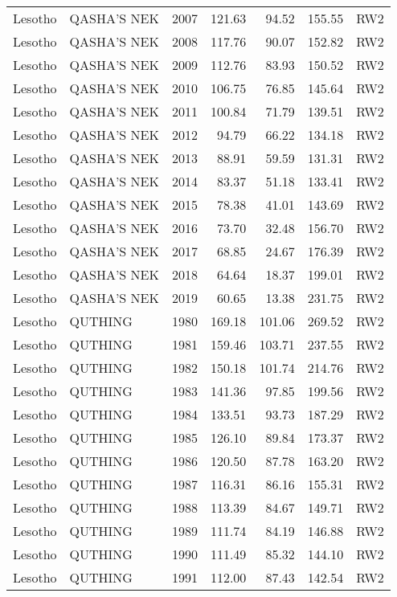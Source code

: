 \begin{longtable}{lllrrrl}
  Lesotho & QASHA'S NEK & 2007 & 121.63 & 94.52 & 155.55 & RW2 \\ 
  Lesotho & QASHA'S NEK & 2008 & 117.76 & 90.07 & 152.82 & RW2 \\ 
  Lesotho & QASHA'S NEK & 2009 & 112.76 & 83.93 & 150.52 & RW2 \\ 
  Lesotho & QASHA'S NEK & 2010 & 106.75 & 76.85 & 145.64 & RW2 \\ 
  Lesotho & QASHA'S NEK & 2011 & 100.84 & 71.79 & 139.51 & RW2 \\ 
  Lesotho & QASHA'S NEK & 2012 & 94.79 & 66.22 & 134.18 & RW2 \\ 
  Lesotho & QASHA'S NEK & 2013 & 88.91 & 59.59 & 131.31 & RW2 \\ 
  Lesotho & QASHA'S NEK & 2014 & 83.37 & 51.18 & 133.41 & RW2 \\ 
  Lesotho & QASHA'S NEK & 2015 & 78.38 & 41.01 & 143.69 & RW2 \\ 
  Lesotho & QASHA'S NEK & 2016 & 73.70 & 32.48 & 156.70 & RW2 \\ 
  Lesotho & QASHA'S NEK & 2017 & 68.85 & 24.67 & 176.39 & RW2 \\ 
  Lesotho & QASHA'S NEK & 2018 & 64.64 & 18.37 & 199.01 & RW2 \\ 
  Lesotho & QASHA'S NEK & 2019 & 60.65 & 13.38 & 231.75 & RW2 \\ 
  Lesotho & QUTHING & 1980 & 169.18 & 101.06 & 269.52 & RW2 \\ 
  Lesotho & QUTHING & 1981 & 159.46 & 103.71 & 237.55 & RW2 \\ 
  Lesotho & QUTHING & 1982 & 150.18 & 101.74 & 214.76 & RW2 \\ 
  Lesotho & QUTHING & 1983 & 141.36 & 97.85 & 199.56 & RW2 \\ 
  Lesotho & QUTHING & 1984 & 133.51 & 93.73 & 187.29 & RW2 \\ 
  Lesotho & QUTHING & 1985 & 126.10 & 89.84 & 173.37 & RW2 \\ 
  Lesotho & QUTHING & 1986 & 120.50 & 87.78 & 163.20 & RW2 \\ 
  Lesotho & QUTHING & 1987 & 116.31 & 86.16 & 155.31 & RW2 \\ 
  Lesotho & QUTHING & 1988 & 113.39 & 84.67 & 149.71 & RW2 \\ 
  Lesotho & QUTHING & 1989 & 111.74 & 84.19 & 146.88 & RW2 \\ 
  Lesotho & QUTHING & 1990 & 111.49 & 85.32 & 144.10 & RW2 \\ 
  Lesotho & QUTHING & 1991 & 112.00 & 87.43 & 142.54 & RW2 \\ 

\end{longtable}
